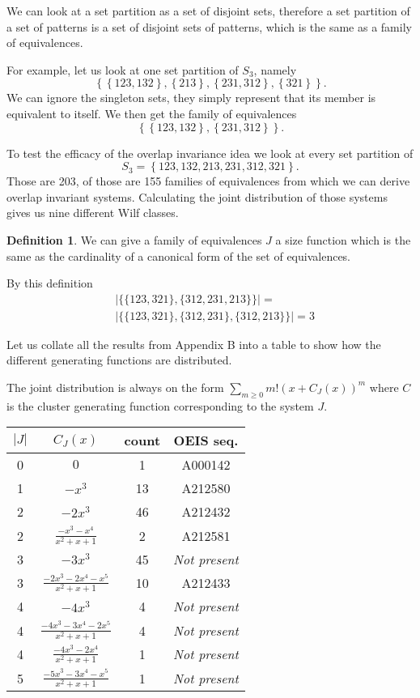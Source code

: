 \documentclass[a4paper, 11pt, english]{article}
\theoremstyle{definition}
\newtheorem{definition}[theorem]{Definition}
\newcommand{\Sym}{S}
\begin{document}
We can look at a set partition as a set of disjoint sets, therefore a set partition of a set of
patterns is a set of disjoint sets of patterns, which is the same as a family of
equivalences.

For example, let us look at one set partition of $\Sym_3$, namely 
\[
  \left\{ \left\{ 123, 132 \right\}, \left\{ 213 \right\}, \left\{ 231, 312 \right\}, \left\{ 321
  \right\} \right\}.
\]
We can ignore the singleton sets, they simply represent that its member is equivalent to itself. We
then get the family of equivalences
\[
  \left\{ \left\{ 123, 132 \right\}, \left\{ 231, 312 \right\} \right\}.
\]


To test the efficacy of the overlap invariance idea we look at every set partition of 
\[
  \Sym_3 = \left\{ 123, 132, 213, 231, 312, 321 \right\}.
\]
Those are 203, of those are 155 families of equivalences from which we can derive overlap
invariant systems.
Calculating the joint distribution of those systems gives us nine different Wilf classes.

\begin{definition}
    We can give a family of equivalences $J$ a size function which is the same
    as the cardinality of a canonical form of the set of equivalences.

    By this definition 
    \begin{align*}
      & | \{ \{ 123, 321 \}, \{ 312, 231, 213 \} \}| =  \\
      & | \{ \{ 123, 321 \}, \{ 312, 231 \}, \{ 312, 213 \} \} | =  3
    \end{align*}
\end{definition}

Let us collate all the results from Appendix B into a table to show how the
different generating functions are distributed.

The joint distribution is always on the form $\sum_{m \geq 0}m!(x+C_J(x))^m$ where $C$
is the cluster generating function corresponding to the system $J$.

\begin{center}
\begin{tabular}{c|c|c|c}
    $|J|$ & $C_J(x)$ & count & OEIS seq. \\
    \hline
    0 & $0$ & 1 & A000142 \\
    1 & $-x^3$ & 13 & A212580 \\
    2 & $-2x^3$ & 46 & A212432 \\
    2 & $\frac{-x^3-x^4}{x^2+x+1}$ & 2 & A212581 \\
    3 & $-3x^3$ & 45 & \emph{Not present} \\
    3 & $\frac{-2x^3-2x^4-x^5}{x^2+x+1}$ & 10 & A212433 \\
    4 & $-4x^3$ & 4 & \emph{Not present} \\
    4 & $\frac{-4x^3-3x^4-2x^5}{x^2+x+1}$ & 4 & \emph{Not present}\\
    4 & $\frac{-4x^3-2x^4}{x^2+x+1}$ & 1 & \emph{Not present} \\ 
    \hline
    \hline
    5 & $\frac{-5x^3-3x^4-x^5}{x^2+x+1}$ & 1 & \emph{Not present} \\ 
\end{tabular}
\end{center}
\end{document}
